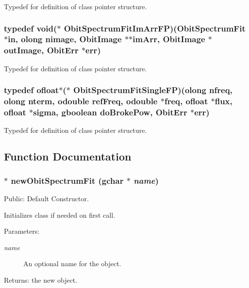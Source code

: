 Typedef for definition of class pointer structure. 

\subsubsection{\setlength{\rightskip}{0pt plus 5cm}typedef void($\ast$ {\bf Obit\-Spectrum\-Fit\-Im\-Arr\-FP})({\bf Obit\-Spectrum\-Fit} $\ast$in, {\bf olong} nimage, {\bf Obit\-Image} $\ast$$\ast$im\-Arr, {\bf Obit\-Image} $\ast$out\-Image, {\bf Obit\-Err} $\ast$err)}\label{ObitSpectrumFit_8h_a5}


Typedef for definition of class pointer structure. 

\subsubsection{\setlength{\rightskip}{0pt plus 5cm}typedef {\bf ofloat}$\ast$($\ast$ {\bf Obit\-Spectrum\-Fit\-Single\-FP})({\bf olong} nfreq, {\bf olong} nterm, {\bf odouble} ref\-Freq, {\bf odouble} $\ast$freq, {\bf ofloat} $\ast$flux, {\bf ofloat} $\ast$sigma, gboolean do\-Broke\-Pow, {\bf Obit\-Err} $\ast$err)}\label{ObitSpectrumFit_8h_a7}


Typedef for definition of class pointer structure. 



\subsection{Function Documentation}
\subsubsection{$\ast$ new\-Obit\-Spectrum\-Fit (gchar $\ast$ {\em name})}\label{ObitSpectrumFit_8h_a9}


Public: Default Constructor. 

Initializes class if needed on first call. \begin{Desc}
\item[Parameters:]
\begin{description}
\item[{\em name}]An optional name for the object. \end{description}
\end{Desc}
\begin{Desc}
\item[Returns:]the new object. \end{Desc}
